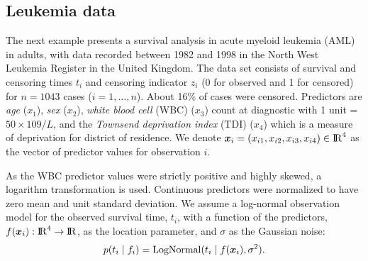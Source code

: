 \subsection{Leukemia data}\label{sec_bf_caseVI}

The next example presents a survival analysis in acute myeloid leukemia (AML) in adults, with data recorded between 1982 and 1998 in the North West Leukemia Register in the United Kingdom. The data set consists of survival and censoring times $t_i$ and censoring indicator $z_i$ (0 for observed and 1 for censored) for $n=1043$ cases ($i=1,\dots,n$). About 16\% of cases were censored. Predictors are \textit{age} ($x_1$), \textit{sex} ($x_2$), \textit{white blood cell} (WBC) ($x_3$) count at diagnostic with 1 unit = $50\times109/L$, and the \textit{Townsend deprivation index} (TDI) ($x_4$) which is a measure of deprivation for district of residence. We denote $\bm{x}_i=(x_{i1},x_{i2},x_{i3},x_{i4}) \in {\rm I\!R}^{4}$ as the vector of predictor values for observation $i$.

As the WBC predictor values were strictly positive and highly skewed, a logarithm transformation is used. Continuous predictors were normalized to have zero mean and unit standard deviation.  
We assume a log-normal observation model for the observed survival time, $t_i$, with a function of the predictors, $f(\bm{x}_i):{\rm I\!R}^4 \to {\rm I\!R}$, as the location parameter, and $\sigma$ as the Gaussian noise: 
%
\begin{equation*}
  p(t_i \mid f_i)= \operatorname{LogNormal}(t_i \mid f(\bm{x}_i),\sigma^2).
\end{equation*}

